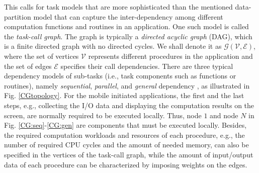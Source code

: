 \documentclass[journal]{IEEEtran}
\begin{document}
This calls for task models that are more sophisticated than the mentioned data-partition model that can capture the inter-dependency among different computation functions and routines  in an application. One such model is called  the \emph{task-call graph}. The  graph is typically a \emph{directed acyclic graph} (DAG), which is a finite directed graph with no directed cycles. We shall denote it as $\mathcal{G}\left(\mathcal{V},\mathcal{E}\right)$, where the set of vertices $\mathcal{V}$ represents different procedures in the application and the set of edges $\mathcal{E}$ specifies their call dependencies. There are three typical dependency models of sub-tasks (i.e., task components such as functions or routines), namely \emph{sequential}, \emph{parallel}, and \emph{general}  dependency \cite{MJiaINFOCOMWS1404,MahmoodiTCC16}, as illustrated in Fig. \ref{CGtopology}. For the mobile initiated applications, the first and the last steps, e.g., collecting the I/O data and displaying the computation results on the screen, are normally required to be executed locally. Thus, node $\text{1}$ and node $N$ in Fig. \ref{CG:seq}-\ref{CG:gen} are components that must be executed locally. Besides, the required computation workloads and resources of each procedure, e.g., the number of required CPU cycles and the amount of needed memory, can also be specified in the vertices of the task-call graph, while the amount of input/output data of each procedure can be characterized by imposing weights on the edges.\\
\end{document}
